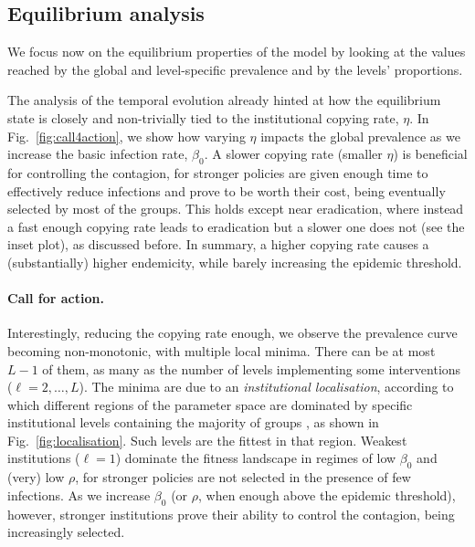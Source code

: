 \subsection{Equilibrium analysis}
\label{coevo.section.eq}

We focus now on the equilibrium properties of the model by looking at the values reached by the global and level-specific prevalence and by the levels' proportions.

The analysis of the temporal evolution already hinted at how the equilibrium state is closely and non-trivially tied to the institutional copying rate, $\eta$. In Fig.~\ref{fig:call4action}, we show how varying $\eta$ impacts the global prevalence as we increase the basic infection rate, $\beta_0$. A slower copying rate (smaller $\eta$) is beneficial for controlling the contagion, for stronger policies are given enough time to effectively reduce infections and prove to be worth their cost, being eventually selected by most of the groups. This holds except near eradication, where instead a fast enough copying rate leads to eradication but a slower one does not (see the inset plot), as discussed before. In summary, a higher copying rate causes a (substantially) higher endemicity, while barely increasing the epidemic threshold.

\paragraph*{Call for action.}

Interestingly, reducing the copying rate enough, we observe the prevalence curve becoming non-monotonic, with multiple local minima. There can be at most $L-1$ of them, as many as the number of levels implementing some interventions ($\ell = 2, \dots, L$). The minima are due to an \textit{institutional localisation}, according to which different regions of the parameter space are dominated by specific institutional levels containing the majority of groups \cite{hebert-dufresne_source-sink_2022}, as shown in Fig.~\ref{fig:localisation}. Such levels are the fittest in that region.  Weakest institutions ($\ell = 1$) dominate the fitness landscape in regimes of low $\beta_0$ and (very) low $\rho$, for stronger policies are not selected in the presence of few infections. As we increase $\beta_0$ (or $\rho$, when enough above the epidemic threshold), however, stronger institutions prove their ability to control the contagion, being increasingly selected.

